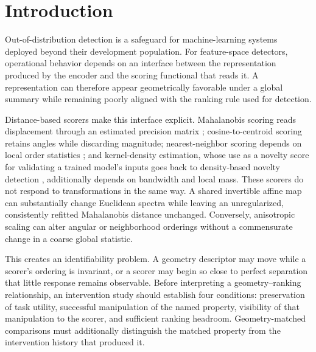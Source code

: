 \documentclass[pdflatex,sn-basic]{sn-jnl}
\theoremstyle{plain}
\theoremstyle{definition}
\theoremstyle{remark}
\begin{document}

\maketitle

\section{Introduction}
Out-of-distribution detection is a safeguard for machine-learning systems deployed beyond their development population. For feature-space detectors, operational behavior depends on an interface between the representation produced by the encoder and the scoring functional that reads it. A representation can therefore appear geometrically favorable under a global summary while remaining poorly aligned with the ranking rule used for detection.

Distance-based scorers make this interface explicit. Mahalanobis scoring reads displacement through an estimated precision matrix \citep{lee2018simple}; cosine-to-centroid scoring retains angles while discarding magnitude; nearest-neighbor scoring depends on local order statistics \citep{sun2022ood}; and kernel-density estimation, whose use as a novelty score for validating a trained model's inputs goes back to density-based novelty detection \citep{bishop1994novelty}, additionally depends on bandwidth and local mass. These scorers do not respond to transformations in the same way. A shared invertible affine map can substantially change Euclidean spectra while leaving an unregularized, consistently refitted Mahalanobis distance unchanged. Conversely, anisotropic scaling can alter angular or neighborhood orderings without a commensurate change in a coarse global statistic.

This creates an identifiability problem. A geometry descriptor may move while a scorer's ordering is invariant, or a scorer may begin so close to perfect separation that little response remains observable. Before interpreting a geometry--ranking relationship, an intervention study should establish four conditions: preservation of task utility, successful manipulation of the named property, visibility of that manipulation to the scorer, and sufficient ranking headroom. Geometry-matched comparisons must additionally distinguish the matched property from the intervention history that produced it.
\end{document}
